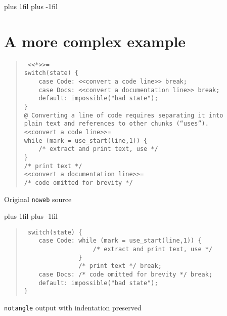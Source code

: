 


\def\semifilbreak{\vskip 0pt plus 1fil\vskip 0pt plus -1fil}

\semifilbreak
\section{A more complex example}

\def\caption#1{\centerline{#1}}

\begin{quote}\tt\obeyspaces\rightskip=-1.5in
<<*>>=\\
switch(state)\ \{\\
\mbox{ }\ \ \ case\ Code:\ <<convert\ a\ code\ line>>\ break;\\
\mbox{ }\ \ \ case\ Docs:\ <<convert\ a\ documentation\ line>>\ break;\\
\mbox{ }\ \ \ default:\ impossible("bad\ state");\\
\}\\
@\ Converting\ a\ line\ of\ code\ requires\ separating\ it\ into\ \\
plain\ text\ and\ references\ to\ other\ chunks\ (``uses'').\\
<<convert\ a\ code\ line>>=\\
while\ (mark\ =\ use\_start(line,1))\ \{\ \\
\mbox{ }\ \ \ /*\ extract\ and\ print\ text,\ use\ */\\
\}\\
/*\ print\ text\ */\\
<<convert\ a\ documentation\ line>>=\\
/*\ code\ omitted\ for\ brevity\ */
\end{quote} 
\caption{Original {\tt noweb} source}

\semifilbreak

\begin{quote}\tt\obeyspaces
switch(state)\ \{\\
\mbox{ }\ \ \ case\ Code:\ while\ (mark\ =\ use\_start(line,1))\ \{\ \\
\mbox{ }\ \ \ \ \ \ \ \ \ \ \ \ \ \ \ \ \ \ /*\ extract\ and\ print\ text,\ use\
 */\\
\mbox{ }\ \ \ \ \ \ \ \ \ \ \ \ \ \ \}\\
\mbox{ }\ \ \ \ \ \ \ \ \ \ \ \ \ \ /*\ print\ text\ */\ break;\\
\mbox{ }\ \ \ case\ Docs:\ /*\ code\ omitted\ for\ brevity\ */\ break;\\
\mbox{ }\ \ \ default:\ impossible("bad\ state");\\
\}
\end{quote} 
\caption{{\tt notangle} output with indentation preserved}

